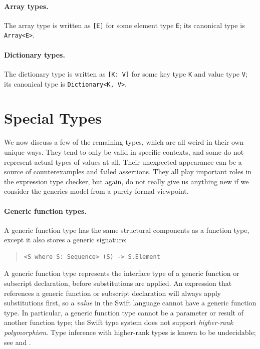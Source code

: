 \documentclass[../generics]{subfiles}
\begin{document}
\paragraph{Array types.} The array type is written as \texttt{[E]} for some element type \texttt{E}; its canonical type is \texttt{Array<E>}.

\paragraph{Dictionary types.} The dictionary type is written as \texttt{[K: V]} for some key type \texttt{K} and value type \texttt{V}; its canonical type is \texttt{Dictionary<K, V>}.

\section{Special Types}\label{sec:special types}

We now discuss a few of the remaining types, which are all weird in their own unique ways. They tend to only be valid in specific contexts, and some do not represent actual types of values at all. Their unexpected appearance can be a source of counterexamples and failed assertions. They all play important roles in the expression type checker, but again, do not really give us anything new if we consider the generics model from a purely formal viewpoint.

\paragraph{Generic function types.}
A generic function type has the same structural components as a function type, except it also stores a generic signature:
\begin{quote}
\begin{verbatim}
<S where S: Sequence> (S) -> S.Element
\end{verbatim}
\end{quote}

A generic function type represents the interface type of a generic function or subscript declaration, before substitutions are applied. An expression that references a generic function or subscript declaration will always apply substitutions first, so a \emph{value} in the Swift language cannot have a generic function type. In particular, a generic function type cannot be a parameter or result of another function type; the Swift type system does not support \emph{higher-rank polymorphism}. Type inference with higher-rank types is known to be undecidable; see \cite{wells} and \cite{practicalhigherrank}.
\end{document}
